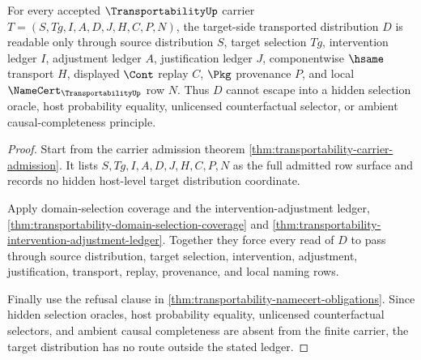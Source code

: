 \begin{theorem}
\label{thm:transportability-target-distribution-nonescape}
For every accepted $\TransportabilityUp$ carrier $T=(S,Tg,I,A,D,J,H,C,P,N)$, the target-side transported distribution $D$ is readable only through source distribution $S$, target selection $Tg$, intervention ledger $I$, adjustment ledger $A$, justification ledger $J$, componentwise $\hsame$ transport $H$, displayed $\Cont$ replay $C$, $\Pkg$ provenance $P$, and local $\NameCert_{\TransportabilityUp}$ row $N$. Thus $D$ cannot escape into a hidden selection oracle, host probability equality, unlicensed counterfactual selector, or ambient causal-completeness principle.
\end{theorem}
\begin{proof}
Start from the carrier admission theorem \autoref{thm:transportability-carrier-admission}. It lists $S,Tg,I,A,D,J,H,C,P,N$ as the full admitted row surface and records no hidden host-level target distribution coordinate.

Apply domain-selection coverage and the intervention-adjustment ledger, \autoref{thm:transportability-domain-selection-coverage} and \autoref{thm:transportability-intervention-adjustment-ledger}. Together they force every read of $D$ to pass through source distribution, target selection, intervention, adjustment, justification, transport, replay, provenance, and local naming rows.

Finally use the refusal clause in \autoref{thm:transportability-namecert-obligations}. Since hidden selection oracles, host probability equality, unlicensed counterfactual selectors, and ambient causal completeness are absent from the finite carrier, the target distribution has no route outside the stated ledger.
\end{proof}

